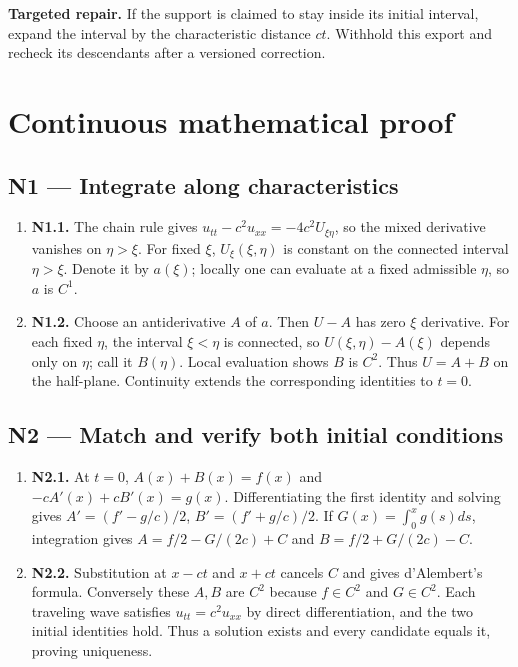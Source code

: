 \documentclass[preprint,12pt,aps,pra,showkeys,amsmath,amssymb,superscriptaddress,floatfix]{revtex4-2}
\theoremstyle{definition}
\theoremstyle{remark}
\newcommand{\field}[2]{\par\smallskip\noindent\textbf{#1.} #2\par}
\begin{document}
\field{Targeted repair}{If the support is claimed to stay inside its initial interval, expand
the interval by the characteristic distance \(ct\). Withhold this export
and recheck its descendants after a versioned correction.}

\endgroup\clearpage\section{Continuous mathematical proof}\label{sec:proof}

\subsection{N1 --- Integrate along
characteristics}\label{n1-integrate-along-characteristics}

\begin{enumerate}
\def\labelenumi{\arabic{enumi}.}
\item
  \textbf{N1.1.} The chain rule gives
  \(u_{tt}-c^2u_{xx}=-4c^2U_{\xi\eta}\), so the mixed derivative
  vanishes on \(\eta>\xi\). For fixed \(\xi\), \(U_\xi(\xi,\eta)\) is
  constant on the connected interval \(\eta>\xi\). Denote it by
  \(a(\xi)\); locally one can evaluate at a fixed admissible \(\eta\),
  so \(a\) is \(C^1\).
\item
  \textbf{N1.2.} Choose an antiderivative \(A\) of \(a\). Then \(U-A\)
  has zero \(\xi\) derivative. For each fixed \(\eta\), the interval
  \(\xi<\eta\) is connected, so \(U(\xi,\eta)-A(\xi)\) depends only on
  \(\eta\); call it \(B(\eta)\). Local evaluation shows \(B\) is
  \(C^2\). Thus \(U=A+B\) on the half-plane. Continuity extends the
  corresponding identities to \(t=0\).
\end{enumerate}

\subsection{N2 --- Match and verify both initial
conditions}\label{n2-match-and-verify-both-initial-conditions}

\begin{enumerate}
\def\labelenumi{\arabic{enumi}.}
\item
  \textbf{N2.1.} At \(t=0\), \(A(x)+B(x)=f(x)\) and
  \(-cA'(x)+cB'(x)=g(x)\). Differentiating the first identity and
  solving gives \(A'=(f'-g/c)/2\), \(B'=(f'+g/c)/2\). If
  \(G(x)=\int_0^x g(s)ds\), integration gives \(A=f/2-G/(2c)+C\) and
  \(B=f/2+G/(2c)-C\).
\item
  \textbf{N2.2.} Substitution at \(x-ct\) and \(x+ct\) cancels \(C\) and
  gives d'Alembert's formula. Conversely these \(A,B\) are \(C^2\)
  because \(f\in C^2\) and \(G\in C^2\). Each traveling wave satisfies
  \(u_{tt}=c^2u_{xx}\) by direct differentiation, and the two initial
  identities hold. Thus a solution exists and every candidate equals it,
  proving uniqueness.
\end{enumerate}
\end{document}
